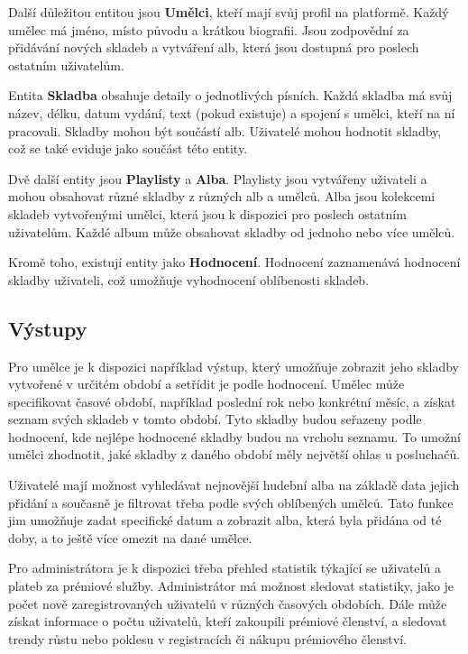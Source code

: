 \documentclass[czech,12pt,a4paper,titlepage]{article}
\begin{document}
    Další důležitou entitou jsou \textbf{Umělci}, kteří mají svůj profil na platformě.
    Každý umělec má jméno, místo původu a krátkou biografii.
    Jsou zodpovědní za přidávání nových skladeb a vytváření alb, která jsou dostupná pro poslech ostatním uživatelům.


    Entita \textbf{Skladba} obsahuje detaily o jednotlivých písních.
    Každá skladba má svůj název, délku, datum vydání, text (pokud existuje) a spojení s umělci, kteří na ní pracovali.
    Skladby mohou být součástí alb.
    Uživatelé mohou hodnotit skladby, což se také eviduje jako součást této entity.


    Dvě další entity jsou \textbf{Playlisty} a \textbf{Alba}.
    Playlisty jsou vytvářeny uživateli a mohou obsahovat různé skladby z různých alb a umělců.
    Alba jsou kolekcemi skladeb vytvořenými umělci, která jsou k dispozici pro poslech ostatním uživatelům.
    Každé album může obsahovat skladby od jednoho nebo více umělců.


    Kromě toho, existují entity jako \textbf{Hodnocení}.
    Hodnocení zaznamenává hodnocení skladby uživateli, což umožňuje vyhodnocení oblíbenosti skladeb.

    \clearpage

    \subsection*{Výstupy}
    Pro umělce je k dispozici například výstup, který umožňuje zobrazit jeho skladby vytvořené v určitém období a setřídit je podle hodnocení.
    Umělec může specifikovat časové období, například poslední rok nebo konkrétní měsíc, a získat seznam svých skladeb v tomto období.
    Tyto skladby budou seřazeny podle hodnocení, kde nejlépe hodnocené skladby budou na vrcholu seznamu.
    To umožní umělci zhodnotit, jaké skladby z daného období měly největší ohlas u posluchačů.

    Uživatelé mají možnost vyhledávat nejnovější hudební alba na základě data jejich přidání a současně je filtrovat třeba podle svých oblíbených umělců.
    Tato funkce jim umožňuje zadat specifické datum a zobrazit alba, která byla přidána od té doby, a to ještě více omezit na dané umělce.


    Pro administrátora je k dispozici třeba přehled statistik týkající se uživatelů a plateb za prémiové služby.
    Administrátor má možnost sledovat statistiky, jako je počet nově zaregistrovaných uživatelů v různých časových obdobích.
    Dále může získat informace o počtu uživatelů, kteří zakoupili prémiové členství, a sledovat trendy růstu nebo poklesu v registracích či nákupu prémiového členství.
\end{document}
